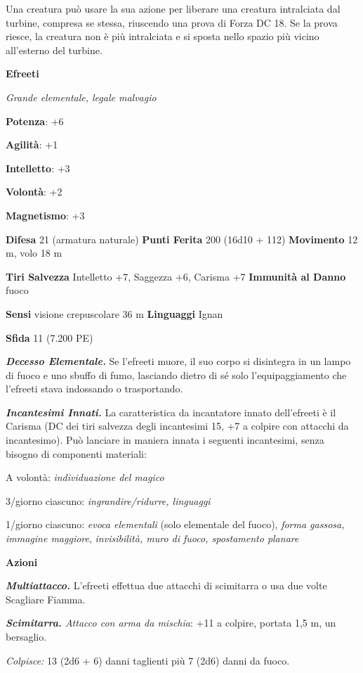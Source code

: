 \begin{multicols}{2}
Una creatura può usare la sua azione per liberare una creatura
intralciata dal turbine, compresa se stessa, riuscendo una prova di
Forza DC 18. Se la prova riesce, la creatura non è più intralciata e si
sposta nello spazio più vicino all'esterno del turbine.

\textbf{Efreeti}

\emph{Grande elementale, legale malvagio}

\textbf{Potenza}: +6

\textbf{Agilità}: +1

\textbf{Intelletto}: +3

\textbf{Volontà}: +2

\textbf{Magnetismo}: +3

\textbf{Difesa} 21 (armatura naturale) \textbf{Punti Ferita}
200 (16d10 + 112) \textbf{Movimento} 12 m, volo 18 m

\textbf{Tiri Salvezza} Intelletto +7, Saggezza +6, Carisma +7
\textbf{Immunità al Danno} fuoco

\textbf{Sensi} visione crepuscolare 36 m
\textbf{Linguaggi} Ignan

\textbf{Sfida} 11 (7.200 PE)

\emph{\textbf{Decesso Elementale.}} Se l'efreeti muore, il suo corpo si
disintegra in un lampo di fuoco e uno sbuffo di fumo, lasciando dietro
di sé solo l'equipaggiamento che l'efreeti stava indossando o
trasportando.

\emph{\textbf{Incantesimi Innati.}} La caratteristica da incantatore
innato dell'efreeti è il Carisma (DC dei tiri salvezza degli incantesimi
15, +7 a colpire con attacchi da incantesimo). Può lanciare in maniera
innata i seguenti incantesimi, senza bisogno di componenti materiali:

A volontà: \emph{individuazione del magico}

3/giorno ciascuno: \emph{ingrandire/ridurre, linguaggi}

1/giorno ciascuno: \emph{evoca elementali} (solo elementale del fuoco),
\emph{forma gassosa, immagine maggiore}, \emph{invisibilità, muro di
fuoco, spostamento planare}

\textbf{Azioni}

\emph{\textbf{Multiattacco.}} L'efreeti effettua due attacchi di
scimitarra o usa due volte Scagliare Fiamma.

\emph{\textbf{Scimitarra.} Attacco con arma da mischia}: +11 a colpire,
portata 1,5 m, un bersaglio.

\emph{Colpisce:} 13 (2d6 + 6) danni taglienti più 7 (2d6) danni da
fuoco.


\end{multicols}
